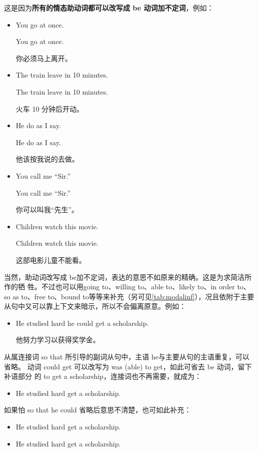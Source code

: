 这是因为\textbf{所有的情态助动词都可以改写成 be 动词加不定词}，例如：
\begin{itemize}
\item   You  go at once.

  \reitem You  go at once.

  你必须马上离开。
\item The train  leave in 10 minutes.

\reitem The train  leave in 10 minutes.

火车 10 分钟后开动。

\item   He  do as I say.

  \reitem He  do as I say.

  他该按我说的去做。

\item   You  call me “Sir.”

  \reitem You  call me “Sir.”

  你可以叫我“先生”。

\item Children  watch this movie.

  \reitem Children  watch this movie.

  这部电影儿童不能看。
\end{itemize}

当然，助动词改写成 be加不定词，表达的意思不如原来的精确。这是为求简洁所作的牺
牲。不过也可以用going to、willing to、able to、likely to、in order to、so as
to、free to、bound to等等来补充（另可见\cref{tab:modalinf}），况且依附于主要
从句中又可以靠上下文来暗示，所以不会偏离原意。例如：

\begin{itemize}
\item He studied hard  he could get a scholarship.

  他努力学习以获得奖学金。
\end{itemize}
从属连接词 so that 所引导的副词从句中，主语 he与主要从句的主语重复，可以省略。
动词 could get 可以改写为 was (able) to get，如此可省去 be 动词，留下补语部分
的 to get a scholarship，连接词也不再需要，就成为：
\begin{itemize}
\item He studied hard  get a scholarship.
\end{itemize}
如果怕 so that he could 省略后意思不清楚，也可如此补充：
\begin{itemize}
\item   He studied hard  get a scholarship.
\item   He studied hard  get a scholarship.
\end{itemize}

